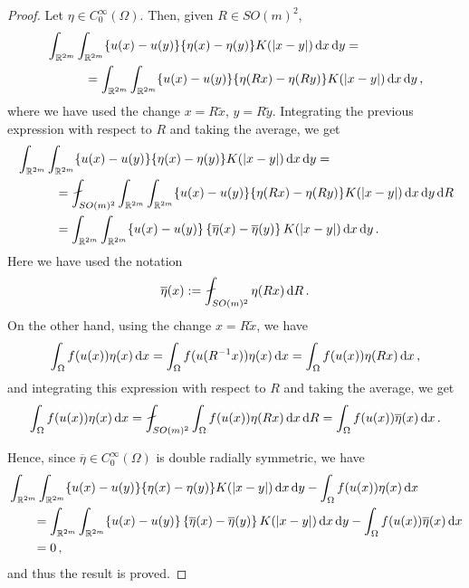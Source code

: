 \begin{proof}
	Let $\eta \in C^\infty_0(\Omega)$. Then, given $R\in SO(m)^2$,
	\begin{align*}
	&\int_{\mathbb{R}^{2m}}\int_{\mathbb{R}^{2m}} \{u(x)-u(y)\}\{\eta(x)-\eta(y)\} K(|x-y|) \,\mathrm{d} x \,\mathrm{d} y = \\
	&\quad \quad \quad = \int_{\mathbb{R}^{2m}}\int_{\mathbb{R}^{2m}} \{u(x)-u(y)\}\{\eta(R x)-\eta(R y)\} K(|x-y|) \,\mathrm{d} x \,\mathrm{d} y\,,
	\end{align*}
	where we have used the change $x = R\tilde{x}$, $y = R \tilde{y}$. Integrating the previous expression with respect to $R$ and taking the average, we get
	\begin{align*}
	& \int_{\R^{2m}}\int_{\R^{2m}} \{u(x)-u(y)\}\{\eta(x)-\eta(y)\} K(|x-y|) \d x \d y = \\
	&\quad \quad \quad =\average_{SO(m)^2} \int_{\R^{2m}}\int_{\R^{2m}} \{u(x)-u(y)\}\{\eta(R x)-\eta(R y)\} K(|x-y|) \d x \d y \d R \\
	&\quad \quad \quad= \int_{\R^{2m}}\int_{\R^{2m}} \{u(x)-u(y)\}\left \{\overline{\eta}(x) -\overline{\eta}(y)  \right \} K(|x-y|) \d x \d y \,.
	\end{align*}
	Here we have used the notation
	$$
	\overline{\eta}(x) := \average_{SO(m)^2}\eta(R x)\d R\,.
	$$
	On the other hand, using the change $x = R\tilde{x}$, we have
	$$
	\int_{\Omega} f(u(x)) \eta(x) \,\mathrm{d} x = \int_{\Omega} f(u(R^{-1}x)) \eta(x) \,\mathrm{d} x = \int_{\Omega} f(u(x)) \eta(Rx) \,\mathrm{d} x\,,
	$$
	and integrating this expression with respect to $R$ and taking the average, we get
	$$
	\int_{\Omega} f(u(x)) \eta(x) \d x = \average_{SO(m)^2} \int_{\Omega} f(u(x)) \eta(Rx) \d x \d R = \int_{\Omega} f(u(x))\overline{\eta}(x) \d x\,.
	$$
	
	Hence, since $\overline{\eta} \in C^\infty_0(\Omega)$ is double radially symmetric, we have
	\begin{align*}
		&\int_{\mathbb{R}^{2m}}\int_{\mathbb{R}^{2m}} \{u(x)-u(y)\}\{\eta(x)-\eta(y)\} K(|x-y|) \,\mathrm{d} x \,\mathrm{d} y - \int_{\Omega} f(u(x)) \eta(x) \,\mathrm{d} x \\
		&\quad \quad= \int_{\mathbb{R}^{2m}}\int_{\mathbb{R}^{2m}} \{u(x)-u(y)\}\left \{\overline{\eta}(x) -\overline{\eta}(y)  \right \} K(|x-y|) \,\mathrm{d} x \,\mathrm{d} y - \int_{\Omega} f(u(x))\overline{\eta}(x) \,\mathrm{d} x \\
		&\quad \quad= 0\,,
	\end{align*}
	and thus the result is proved.
\end{proof}

